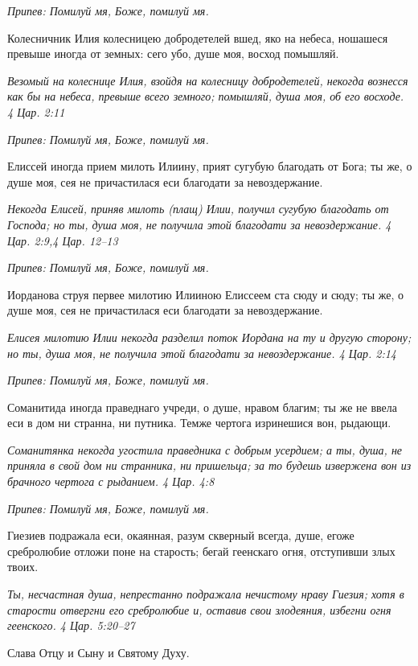 \itshape Припев:\normalfont{} Помилуй мя, Боже, помилуй мя.


Колесничник Илия колесницею добродетелей вшед, яко на небеса, ношашеся превыше иногда от земных: сего убо, душе моя, восход помышляй.


\itshape Везомый на колеснице Илия, взойдя на колесницу добродетелей, некогда вознесся как бы на небеса, превыше всего земного; помышляй, душа моя, об его восходе. 4 Цар. 2:11\normalfont{}


\itshape Припев:\normalfont{} Помилуй мя, Боже, помилуй мя.


Елиссей иногда прием милоть Илиину, прият сугубую благодать от Бога; ты же, о душе моя, сея не причастилася еси благодати за невоздержание.


\itshape Некогда Елисей, приняв милоть (плащ) Илии, получил сугубую благодать от Господа; но ты, душа моя, не получила этой благодати за невоздержание. 4 Цар. 2:9,4 Цар. 12–13\normalfont{}


\itshape Припев:\normalfont{} Помилуй мя, Боже, помилуй мя.


Иорданова струя первее милотию Илииною Елиссеем ста сюду и сюду; ты же, о душе моя, сея не причастилася еси благодати за невоздержание.


\itshape Елисея милотию Илии некогда разделил поток Иордана на ту и другую сторону; но ты, душа моя, не получила этой благодати за невоздержание. 4 Цар. 2:14\normalfont{}


\itshape Припев:\normalfont{} Помилуй мя, Боже, помилуй мя.


Соманитида иногда праведнаго учреди, о душе, нравом благим; ты же не ввела еси в дом ни странна, ни путника. Темже чертога изринешися вон, рыдающи.


\itshape Соманитянка некогда угостила праведника с добрым усердием; а ты, душа, не приняла в свой дом ни странника, ни пришельца; за то будешь извержена вон из брачного чертога с рыданием. 4 Цар. 4:8\normalfont{}


\itshape Припев:\normalfont{} Помилуй мя, Боже, помилуй мя.


Гиезиев подражала еси, окаянная, разум скверный всегда, душе, егоже сребролюбие отложи поне на старость; бегай геенскаго огня, отступивши злых твоих.


\itshape Ты, несчастная душа, непрестанно подражала нечистому нраву Гиезия; хотя в старости отвергни его сребролюбие и, оставив свои злодеяния, избегни огня геенского. 4 Цар. 5:20–27\normalfont{}


Слава Отцу и Сыну и Святому Духу.


